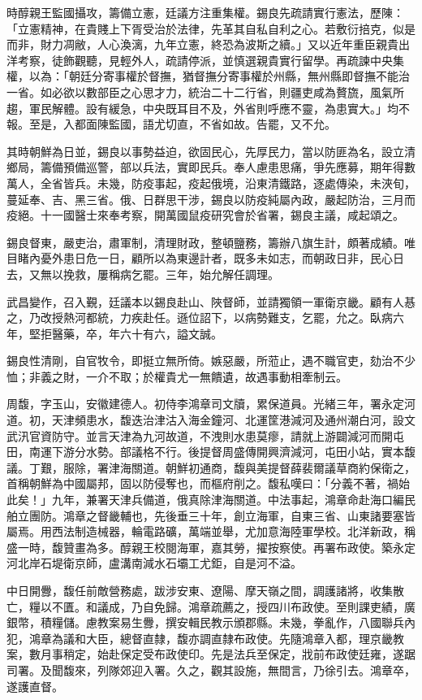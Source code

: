 \begin{pinyinscope}
時醇親王監國攝攻，籌備立憲，廷議方注重集權。錫良先疏請實行憲法，歷陳：「立憲精神，在貴賤上下胥受治於法律，先革其自私自利之心。若敷衍掊克，似是而非，財力凋敝，人心渙漓，九年立憲，終恐為波斯之續。」又以近年重臣親貴出洋考察，徒飾觀聽，見輕外人，疏請停派，並慎選親貴實行留學。再疏諫中央集權，以為：「朝廷分寄事權於督撫，猶督撫分寄事權於州縣，無州縣即督撫不能治一省。如必欲以數部臣之心思才力，統治二十二行省，則疆吏咸為贅旒，風氣所趨，軍民解體。設有緩急，中央既耳目不及，外省則呼應不靈，為患實大。」均不報。至是，入都面陳監國，語尤切直，不省如故。告罷，又不允。

其時朝鮮為日並，錫良以事勢益迫，欲固民心，先厚民力，當以防匪為名，設立清鄉局，籌備預備巡警，部以兵法，實即民兵。奉人慮患思痛，爭先應募，期年得數萬人，全省皆兵。未幾，防疫事起，疫起俄境，沿東清鐵路，逐處傳染，未浹旬，蔓延奉、吉、黑三省。俄、日群思干涉，錫良以防疫純屬內政，嚴起防治，三月而疫絕。十一國醫士來奉考察，開萬國鼠疫研究會於省署，錫良主議，咸起頌之。

錫良督東，嚴吏治，肅軍制，清理財政，整頓鹽務，籌辦八旗生計，頗著成績。唯目睹內憂外患日危一日，顧所以為東邊計者，既多未如志，而朝政日非，民心日去，又無以挽救，屢稱病乞罷。三年，始允解任調理。

武昌變作，召入覲，廷議本以錫良赴山、陜督師，並請獨領一軍衛京畿。顧有人惎之，乃改授熱河都統，力疾赴任。遜位詔下，以病勢難支，乞罷，允之。臥病六年，堅拒醫藥，卒，年六十有六，謚文誠。

錫良性清剛，自官牧令，即挺立無所倚。嫉惡嚴，所蒞止，遇不職官吏，劾治不少恤；非義之財，一介不取；於權貴尤一無饋遺，故遇事動相牽制云。

周馥，字玉山，安徽建德人。初侍李鴻章司文牘，累保道員。光緒三年，署永定河道。初，天津頻患水，馥迭治津沽入海金鐘河、北運筐港減河及通州潮白河，設文武汛官資防守。並言天津為九河故道，不洩則水患莫瘳，請就上游闢減河而開屯田，南運下游分水勢。部議格不行。後提督周盛傳開興濟減河，屯田小站，實本馥議。丁艱，服除，署津海關道。朝鮮初通商，馥與美提督薛裴爾議草商約保衛之，首稱朝鮮為中國屬邦，固以防侵奪也，而樞府削之。馥私嘆曰：「分義不著，禍始此矣！」九年，兼署天津兵備道，俄真除津海關道。中法事起，鴻章命赴海口編民舶立團防。鴻章之督畿輔也，先後垂三十年，創立海軍，自東三省、山東諸要塞皆屬焉。用西法制造械器，輪電路礦，萬端並舉，尤加意海陸軍學校。北洋新政，稱盛一時，馥贊畫為多。醇親王校閱海軍，嘉其勞，擢按察使。再署布政使。築永定河北岸石堤衛京師，盧溝南減水石壩工尤鉅，自是河不溢。

中日開釁，馥任前敵營務處，跋涉安東、遼陽、摩天嶺之間，調護諸將，收集散亡，糧以不匱。和議成，乃自免歸。鴻章疏薦之，授四川布政使。至則課吏績，廣銀幣，積糧儲。慮教案易生釁，撰安輯民教示頒郡縣。未幾，拳亂作，八國聯兵內犯，鴻章為議和大臣，總督直隸，馥亦調直隸布政使。先隨鴻章入都，理京畿教案，數月事稍定，始赴保定受布政使印。先是法兵至保定，戕前布政使廷雍，遂踞司署。及聞馥來，列隊郊迎入署。久之，觀其設施，無間言，乃徐引去。鴻章卒，遂護直督。


\end{pinyinscope}
